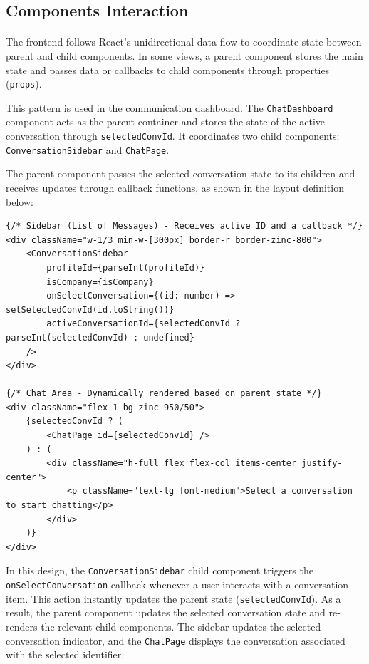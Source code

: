 \subsection{Components Interaction}

\paragraph{}The frontend follows React's unidirectional data flow to coordinate state between parent and child components. In some views, a parent component stores the main state and passes data or callbacks to child components through properties (\texttt{props}).

This pattern is used in the communication dashboard. The \texttt{ChatDashboard} component acts as the parent container and stores the state of the active conversation through \texttt{selectedConvId}. It coordinates two child components: \texttt{ConversationSidebar} and \texttt{ChatPage}.

The parent component passes the selected conversation state to its children and receives updates through callback functions, as shown in the layout definition below:

\begin{lstlisting}[caption={Parent state delegation inside ChatDashboard}, label={lst:chat-dashboard-interaction}]
{/* Sidebar (List of Messages) - Receives active ID and a callback */}
<div className="w-1/3 min-w-[300px] border-r border-zinc-800">
    <ConversationSidebar 
        profileId={parseInt(profileId)} 
        isCompany={isCompany}
        onSelectConversation={(id: number) => setSelectedConvId(id.toString())}
        activeConversationId={selectedConvId ? parseInt(selectedConvId) : undefined}
    />
</div>

{/* Chat Area - Dynamically rendered based on parent state */}
<div className="flex-1 bg-zinc-950/50">
    {selectedConvId ? (
        <ChatPage id={selectedConvId} />
    ) : (
        <div className="h-full flex flex-col items-center justify-center">
            <p className="text-lg font-medium">Select a conversation to start chatting</p>
        </div>
    )}
</div>
\end{lstlisting}

In this design, the \texttt{ConversationSidebar} child component triggers the \texttt{onSelectConversation} callback whenever a user interacts with a conversation item. This action instantly updates the parent state (\texttt{selectedConvId}). As a result, the parent component updates the selected conversation state and re-renders the relevant child components. The sidebar updates the selected conversation indicator, and the \texttt{ChatPage} displays the conversation associated with the selected identifier.


